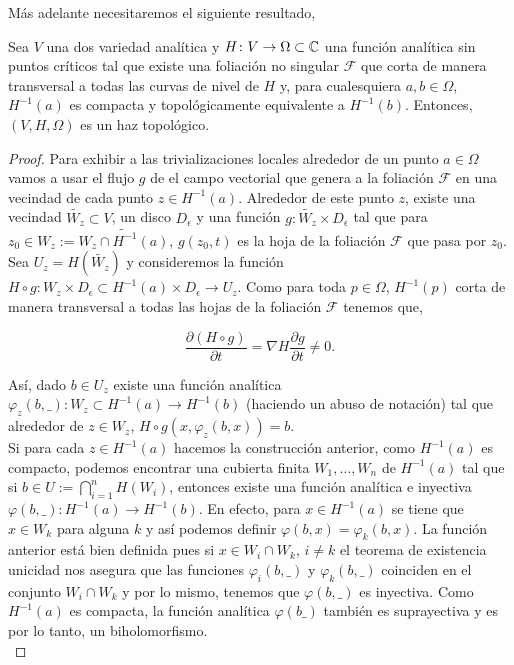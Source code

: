 Más adelante necesitaremos el siguiente resultado,

\begin{Lema}
\label{Lema:HazTopologico}
Sea $V$ una dos variedad analítica y $H\colon V \rightarrow\Omega\subset\mathbb{C}$ una función analítica sin puntos críticos tal que existe una foliación no singular $\mathcal{F}$ que corta de manera transversal a todas las curvas de nivel de $H$ y, para cualesquiera $a,b\in \Omega$, $H^{-1}(a)$ es compacta y topológicamente equivalente a $H^{-1}(b)$. Entonces, $(V,H,\Omega)$ es un haz topológico.
\end{Lema}
\begin{proof}
Para exhibir a las trivializaciones locales alrededor de un punto $a\in \Omega$ vamos a usar el flujo $g$ de el campo vectorial que genera a la foliación $\mathcal{F}$ en una vecindad de cada punto $z\in H^{-1}(a)$. Alrededor de este punto $z$, existe una vecindad $\tilde{W_{z}}\subset V$, un disco $D_{\epsilon}$ y una función $g\colon \tilde{W_{z}}\times D_{\epsilon}$ tal que para $z_{0}\in W_{z}:=\tilde{W_{z}\cap H^{-1}(a)}$, $g(z_{0},t)$ es la hoja de la foliación $\mathcal{F}$ que pasa por $z_{0}$.\\
Sea $U_{z}=H(\tilde{W_{z}})$ y consideremos la función $H\circ g\colon W_{z}\times D_{\epsilon}\subset H^{-1}(a)\times D_{\epsilon}\rightarrow U_{z}$. Como  para toda $p\in\Omega$, $H^{-1}(p)$ corta de manera transversal a todas las hojas de la foliación $\mathcal{F}$ tenemos que,

$$\frac{\partial (H\circ g)}{\partial t}=\nabla H\frac{\partial g}{\partial t}\neq 0.$$

Así, dado $b\in U_{z}$ existe una función analítica $\varphi_{z}(b,\_)\colon W_{z}\subset H^{-1}(a)\rightarrow H^{-1}(b)$ (haciendo un abuso de notación) tal que alrededor de $z\in W_{z}$, $H\circ g(x,\varphi_{z}(b,x))=b$.\\

Si para cada $z\in H^{-1}(a)$ hacemos la construcción anterior, como $H^{-1}(a)$ es compacto, podemos encontrar una cubierta finita $W_{1},\ldots,W_{n}$ de $H^{-1}(a)$ tal que si $b\in U:=\bigcap_{i=1}^{n} H(W_{i})$, entonces existe una función analítica e inyectiva $\varphi(b,\_)\colon H^{-1}(a)\rightarrow H^{-1}(b)$. En efecto, para $x\in H^{-1}(a)$ se tiene que $x\in W_{k}$ para alguna $k$ y así podemos definir $\varphi(b,x)=\varphi_{k}(b,x)$. La función anterior está bien definida pues si $x\in W_{i}\cap W_{k},\, i\neq k$ el teorema de existencia unicidad nos asegura que las funciones $\varphi_{i}(b,\_)$ y $\varphi_{k}(b,\_)$ coinciden en el conjunto $W_{i}\cap W_{k}$ y por lo mismo, tenemos que $\varphi(b,\_)$ es inyectiva. Como $H^{-1}(a)$ es compacta, la función analítica $\varphi(b\_)$ también es suprayectiva y es por lo tanto, un biholomorfismo.\\



\end{proof}
